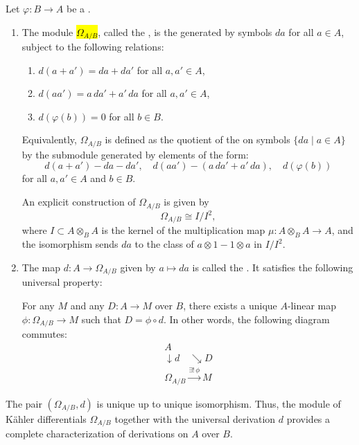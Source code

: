 \begin{definition} \label{definition:module_of_kahler_differentials_of_a_ring_homomorphism}
    Let $\varphi: B \to A$ be a .

    \begin{enumerate}
        \item The module \hl{$\Omega_{A/B}$}, called the , is the  generated by symbols $da$ for all $a \in A$, subject to the following relations:
        \begin{enumerate}
            \item $d(a + a') = da + da'$ for all $a, a' \in A$,
            \item $d(aa') = a\,da' + a'\,da$ for all $a, a' \in A$,
            \item $d(\varphi(b)) = 0$ for all $b \in B$.
        \end{enumerate}

        Equivalently, $\Omega_{A/B}$ is defined as the quotient of the  on symbols $\{da \mid a \in A\}$ by the submodule generated by elements of the form:
        $$ d(a + a') - da - da', \quad d(aa') - (a\,da' + a'\,da), \quad d(\varphi(b)) $$
        for all $a, a' \in A$ and $b \in B$.

        An explicit construction of $\Omega_{A/B}$ is given by
        $$\Omega_{A/B} \cong I / I^2,$$
        where $I \subset A \otimes_B A$ is the kernel of the multiplication map $\mu: A \otimes_B A \to A$, and the isomorphism sends $da$ to the class of $a \otimes 1 - 1 \otimes a$ in $I/I^2$.

        \item The map $d: A \to \Omega_{A/B}$ given by $a \mapsto da$ is called the . It satisfies the following universal property:

        For any  $M$ and any  $D: A \to M$ over $B$, there exists a unique $A$-linear map $\phi: \Omega_{A/B} \to M$ such that $D = \phi \circ d$. In other words, the following diagram commutes:
        $$
        \begin{array}{c}
        A \\
        \downarrow{\scriptstyle d} \quad \searrow{\scriptstyle D} \\
        \Omega_{A/B} \xrightarrow{\exists! \, \phi} M
        \end{array}
        $$
    \end{enumerate}

    The pair $(\Omega_{A/B}, d)$ is unique up to unique isomorphism. Thus, the module of Kähler differentials $\Omega_{A/B}$ together with the universal derivation $d$ provides a complete characterization of derivations on $A$ over $B$.
\end{definition}
